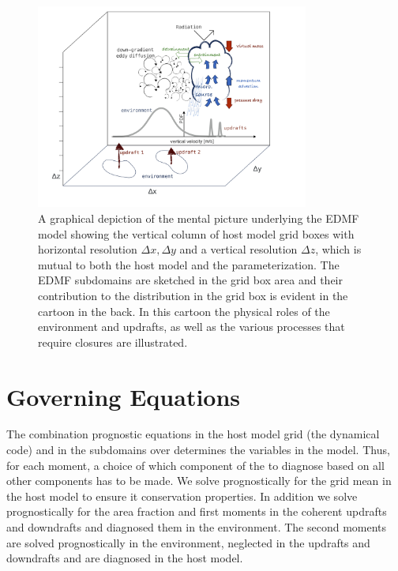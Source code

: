 \documentclass{report}
\begin{document}
\begin{figure}[htb]
\noindent\includegraphics[width=0.8\textwidth]{CLIMA-parameterization/figures/sketch_design_docs.jpg}
\caption{A graphical depiction of the mental picture underlying the EDMF model showing the vertical column of host model grid boxes with horizontal resolution $\Delta x, \Delta y$ and a vertical resolution $\Delta z$, which is mutual to both the host model and the parameterization. The EDMF subdomains are sketched in the grid box area and their contribution to the distribution in the grid box is evident in the cartoon in the back. In this cartoon the physical roles of the environment and updrafts, as well as the various processes that require closures are illustrated.}
\label{fig:EDMF sketch}
\end{figure}

\section{Governing Equations} \label{sec:Governing Equations} 
The combination prognostic equations in the host model grid (the dynamical code) and in the subdomains over determines the variables in the model. Thus, for each moment, a choice of which component of the to diagnose based on all other components has to be made. We solve prognostically for the grid mean in the host model to ensure it conservation properties. In addition we solve prognostically for the area fraction and first moments in the coherent updrafts and downdrafts and diagnosed them in the environment. The second moments are solved prognostically in the environment, neglected in the updrafts and downdrafts and are diagnosed in the host model.
\end{document}

